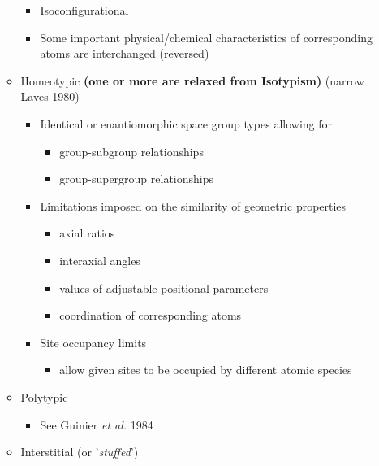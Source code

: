 \documentclass[11pt]{article}
\providecommand{\tightlist}{%
      \setlength{\itemsep}{0pt}\setlength{\parskip}{0pt}}
\begin{document}
\begin{itemize}
\begin{itemize}
    \begin{itemize}
    \tightlist
    \item
      Isoconfigurational
    \item
      Some important physical/chemical characteristics of corresponding
      atoms are interchanged (reversed)
    \end{itemize}
  \item
    Homeotypic \textbf{(one or more are relaxed from Isotypism)} (narrow
    Laves 1980)

    \begin{itemize}
    \tightlist
    \item
      Identical or enantiomorphic space group types allowing for

      \begin{itemize}
      \tightlist
      \item
        group-subgroup relationships
      \item
        group-supergroup relationships
      \end{itemize}
    \item
      Limitations imposed on the similarity of geometric properties

      \begin{itemize}
      \tightlist
      \item
        axial ratios
      \item
        interaxial angles
      \item
        values of adjustable positional parameters
      \item
        coordination of corresponding atoms
      \end{itemize}
    \item
      Site occupancy limits

      \begin{itemize}
      \tightlist
      \item
        allow given sites to be occupied by different atomic species
      \end{itemize}
    \end{itemize}
  \item
    Polytypic

    \begin{itemize}
    \tightlist
    \item
      See Guinier \emph{et al.} 1984
    \end{itemize}
  \item
    Interstitial (or '\emph{stuffed}')


\end{itemize}
\end{itemize}
\end{document}
